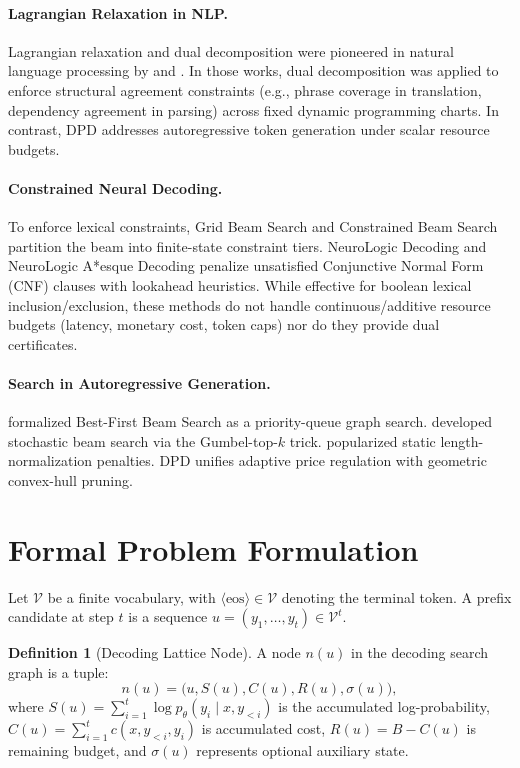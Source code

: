 \documentclass[11pt,a4paper]{article}
\theoremstyle{plain}
\theoremstyle{definition}
\newtheorem{definition}{Definition}
\theoremstyle{remark}
\begin{document}
\paragraph{Lagrangian Relaxation in NLP.}
Lagrangian relaxation and dual decomposition were pioneered in natural language processing by \citet{rush2012tutorial} and \citet{chang2011exact}. In those works, dual decomposition was applied to enforce structural agreement constraints (e.g., phrase coverage in translation, dependency agreement in parsing) across fixed dynamic programming charts. In contrast, DPD addresses autoregressive token generation under scalar resource budgets.

\paragraph{Constrained Neural Decoding.}
To enforce lexical constraints, Grid Beam Search \citep{hokamp2017lexically} and Constrained Beam Search \citep{anderson2017guided} partition the beam into finite-state constraint tiers. NeuroLogic Decoding \citep{lu2021neurologic} and NeuroLogic A*esque Decoding \citep{lu2022neurologic} penalize unsatisfied Conjunctive Normal Form (CNF) clauses with lookahead heuristics. While effective for boolean lexical inclusion/exclusion, these methods do not handle continuous/additive resource budgets (latency, monetary cost, token caps) nor do they provide dual certificates.

\paragraph{Search in Autoregressive Generation.}
\citet{meister2020best} formalized Best-First Beam Search as a priority-queue graph search. \citet{kool2019stochastic} developed stochastic beam search via the Gumbel-top-$k$ trick. \citet{wu2016google} popularized static length-normalization penalties. DPD unifies adaptive price regulation with geometric convex-hull pruning.

\section{Formal Problem Formulation}
Let $\mathcal{V}$ be a finite vocabulary, with $\langle\text{eos}\rangle \in \mathcal{V}$ denoting the terminal token. A prefix candidate at step $t$ is a sequence $u = (y_1, \dots, y_t) \in \mathcal{V}^t$.

\begin{definition}[Decoding Lattice Node]
A node $n(u)$ in the decoding search graph is a tuple:
\begin{equation}
n(u) = \big(u, S(u), C(u), R(u), \sigma(u)\big),
\end{equation}
where $S(u) = \sum_{i=1}^t \log p_\theta(y_i \mid x, y_{<i})$ is the accumulated log-probability, $C(u) = \sum_{i=1}^t c(x, y_{<i}, y_i)$ is accumulated cost, $R(u) = B - C(u)$ is remaining budget, and $\sigma(u)$ represents optional auxiliary state.
\end{definition}
\end{document}
